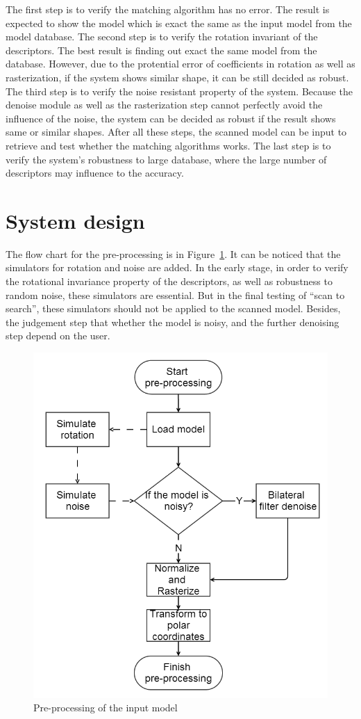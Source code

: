The first step is to verify the matching algorithm has no error. The result is expected to show the model which is exact the same as the input model from the model database. The second step is to verify the rotation invariant of the descriptors. The best result is finding out exact the same model from the database. However, due to the protential error of coefficients in rotation as well as rasterization, if the system shows similar shape, it can be still decided as robust. The third step is to verify the noise resistant property of the system. Because the denoise module as well as the rasterization step cannot perfectly avoid the influence of the noise, the system can be decided as robust if the result shows same or similar shapes. After all these steps, the scanned model can be input to retrieve and test whether the matching algorithms works. The last step is to verify the system's robustness to large database, where the large number of descriptors may influence to the accuracy. 

\section{System design}

The flow chart for the pre-processing is in Figure~\ref{scan2search_preprocessing}. It can be noticed that the simulators for rotation and noise are added. In the early stage, in order to verify the rotational invariance property of the descriptors, as well as robustness to random noise, these simulators are essential. But in the final testing of ``scan to search'', these simulators should not be applied to the scanned model. Besides, the judgement step that whether the model is noisy, and the further denoising step depend on the user. 

\begin{figure}[h]
\centering
\includegraphics[width=0.5\linewidth]{scan2search_preprocessing}
\caption{Pre-processing of the input model} \label{scan2search_preprocessing}
\end{figure}

